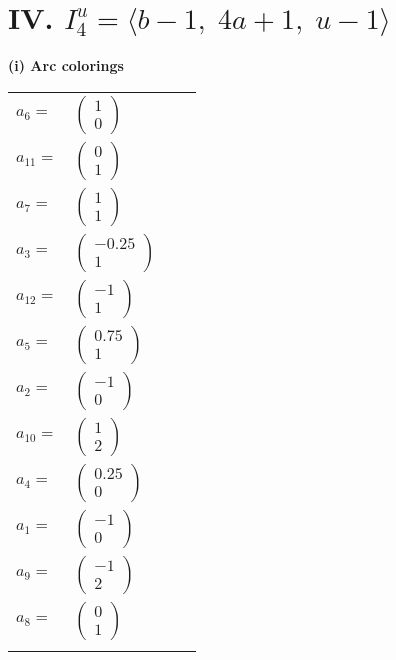 \documentclass[1p]{elsarticle_modified}
\theoremstyle{definition}
\begin{document}
\centering \section*{IV. $I^u_{4}= \langle b-1,\;4 a+1,\;u-1 \rangle$}
\flushleft \textbf{(i) Arc colorings}\\
\begin{tabular}{m{7pt} m{180pt} m{7pt} m{180pt} }
\flushright $a_{6}=$&$\begin{pmatrix}1\\0\end{pmatrix}$ \\
\flushright $a_{11}=$&$\begin{pmatrix}0\\1\end{pmatrix}$ \\
\flushright $a_{7}=$&$\begin{pmatrix}1\\1\end{pmatrix}$ \\
\flushright $a_{3}=$&$\begin{pmatrix}-0.25\\1\end{pmatrix}$ \\
\flushright $a_{12}=$&$\begin{pmatrix}-1\\1\end{pmatrix}$ \\
\flushright $a_{5}=$&$\begin{pmatrix}0.75\\1\end{pmatrix}$ \\
\flushright $a_{2}=$&$\begin{pmatrix}-1\\0\end{pmatrix}$ \\
\flushright $a_{10}=$&$\begin{pmatrix}1\\2\end{pmatrix}$ \\
\flushright $a_{4}=$&$\begin{pmatrix}0.25\\0\end{pmatrix}$ \\
\flushright $a_{1}=$&$\begin{pmatrix}-1\\0\end{pmatrix}$ \\
\flushright $a_{9}=$&$\begin{pmatrix}-1\\2\end{pmatrix}$ \\
\flushright $a_{8}=$&$\begin{pmatrix}0\\1\end{pmatrix}$\\&\end{tabular}
\end{document}
